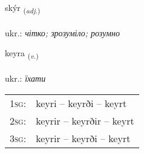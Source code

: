 \documentclass[frontgrid, backgrid]{flacards}\usepackage[]{graphicx}\usepackage[]{xcolor}
\begin{document}
\renewcommand{\flhead}{\vskip5pt \fboxsep=0pt {\small\bfseries\footnotesize Lýsingarorð | прикметник}}
\renewcommand{\fcfoot}{\vskip5pt \fboxsep=0pt \hspace{2pt}{\small\bfseries\footnotesize 2K}}

\renewcommand{\blhead}{\vskip5pt {\small\bfseries\footnotesize Lýsingarorð | прикметник }}
\renewcommand{\bcfoot}{\vskip5pt \hspace{2pt}{\small\bfseries\footnotesize 2K}}


{skýr \small{\textsubscript{(\textit{adj.})}} \\[1ex] %
\textphonetic{[sciːr]} \\
ukr.: \emph{чітко; зрозуміло; розумно} \\  [2ex]
\renewcommand*{\arraystretch}{0.8}
}

\renewcommand{\flhead}{\vskip5pt \fboxsep=0pt {\small\bfseries\footnotesize Sagnorð | дієслово}}
\renewcommand{\fcfoot}{\vskip5pt \fboxsep=0pt \hspace{2pt}{\small\bfseries\footnotesize 2K}}

\renewcommand{\blhead}{\vskip5pt {\small\bfseries\footnotesize Sagnorð | дієслово }}
\renewcommand{\bcfoot}{\vskip5pt \hspace{2pt}{\small\bfseries\footnotesize 2K}}


{keyra \small{\textsubscript{(\textit{v.})}} \\[1ex] %
\textphonetic{[cʰeiːra]} \\
ukr.: \emph{їхати} \\  [2ex]
\renewcommand*{\arraystretch}{0.8}
\begin{tabular}{p{1cm}l}
\textsc{1sg}: & keyri -- keyrði -- keyrt \\ 
\textsc{2sg}: & keyrir -- keyrðir -- keyrt \\ 
\textsc{3sg}: & keyrir -- keyrði -- keyrt \\ 
\end{tabular}
}
\end{document}
